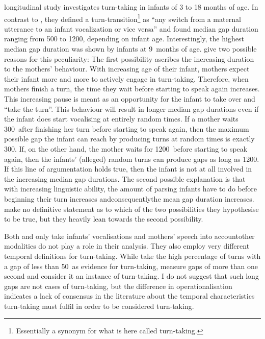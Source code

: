  longitudinal study investigates turn-taking in infants of 3 to 18 months of age.
In contrast to \citet{gratier_early_2015}, they defined a turn-transition\footnote{Essentially a synonym for what is here called turn-taking.} as ``any switch from a maternal utterance to an infant vocalization or vice versa'' \citep[]{hilbrink_early_2015} and found median gap duration ranging from 500 to 1200\ms, depending on infant age.
Interestingly, the highest median gap duration was shown by infants at 9~months of age.
\citet{hilbrink_early_2015} give two possible reasons for this peculiarity:
The first possibility ascribes the increasing duration to the mothers' behaviour.
With increasing age of their infant, mothers expect their infant more and more to actively engage in turn-taking.
Therefore, when mothers finish a turn, the time they wait before starting to speak again increases.
This increasing pause is meant as an opportunity for the infant to take over and ``take the turn''.
This behaviour will result in longer median gap durations even if the infant does start vocalising at entirely random times.
If a mother waits 300\ms\ after finishing her turn before starting to speak again, then the maximum possible gap the infant can reach by producing turns at random times is exactly 300\ms.
If, on the other hand, the mother waits for 1200\ms\ before starting to speak again, then the infants' (alleged) random turns can produce gaps as long as 1200\ms.
If this line of argumentation holds true, then the infant is not at all involved in the increasing median gap durations.
The second possible explanation is that with increasing linguistic ability, the amount of parsing infants have to do before beginning their turn increases and\dash consequently\dash the mean gap duration increases.
\citet[]{hilbrink_early_2015} make no definitive statement as to which of the two possibilities they hypothesise to be true, but they heavily lean towards the second possibility.

Both \citet{gratier_early_2015} and \citet{hilbrink_early_2015} only take infants' vocalisations and mothers' speech into account\dash other modalities do not play a role in their analysis.
They also employ very different temporal definitions for turn-taking.
While \citet{gratier_early_2015} take the high percentage of turns with a gap of less than 50\ms\ as evidence for turn-taking, \citet{hilbrink_early_2015} measure gaps of more than one second and consider it an instance of turn-taking.
I do not suggest that such long gaps are not cases of turn-taking, but the difference in operationalisation indicates a lack of consensus in the literature about the temporal characteristics turn-taking must fulfil in order to be considered turn-taking.


